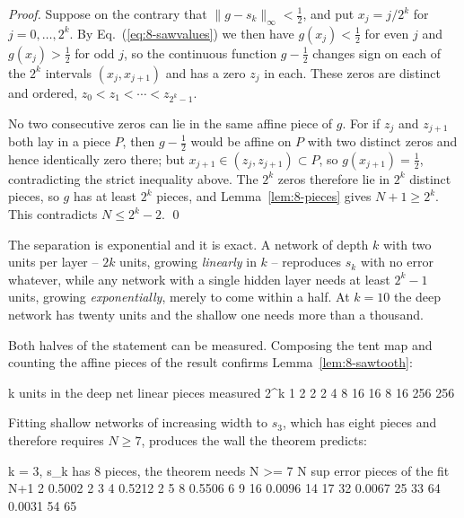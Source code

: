 \begin{proof}
Suppose on the contrary that $\|g-s_k\|_\infty<\tfrac12$, and put
$x_j=j/2^{k}$ for $j=0,\dots,2^{k}$.  By Eq.~(\ref{eq:8-sawvalues}) we then
have $g(x_j)<\tfrac12$ for even $j$ and $g(x_j)>\tfrac12$ for odd $j$, so the
continuous function $g-\tfrac12$ changes sign on each of the $2^{k}$ intervals
$(x_j,x_{j+1})$ and has a zero $z_j$ in each.  These zeros are distinct and
ordered, $z_0<z_1<\cdots<z_{2^{k}-1}$.

No two consecutive zeros can lie in the same affine piece of $g$.  For if $z_j$
and $z_{j+1}$ both lay in a piece $P$, then $g-\tfrac12$ would be affine on $P$
with two distinct zeros and hence identically zero there; but
$x_{j+1}\in(z_j,z_{j+1})\subset P$, so $g(x_{j+1})=\tfrac12$, contradicting the
strict inequality above.  The $2^{k}$ zeros therefore lie in $2^{k}$ distinct
pieces, so $g$ has at least $2^{k}$ pieces, and Lemma~\ref{lem:8-pieces} gives
$N+1\ge2^{k}$.  This contradicts $N\le2^{k}-2$.
\qed
\end{proof}

The separation is exponential and it is exact.  A network of depth $k$ with two
units per layer -- $2k$ units, growing \emph{linearly} in $k$ -- reproduces
$s_k$ with no error whatever, while any network with a single hidden layer
needs at least $2^{k}-1$ units, growing \emph{exponentially}, merely to come
within a half.  At $k=10$ the deep network has twenty units and the shallow one
needs more than a thousand.

Both halves of the statement can be measured.  Composing the tent map and
counting the affine pieces of the result confirms Lemma~\ref{lem:8-sawtooth}:

\begin{Python}{}
     k   units in the deep net   linear pieces measured   2^k
     1                       2                        2      2
     4                       8                       16     16
     8                      16                      256    256
\end{Python}

Fitting shallow networks of increasing width to $s_3$, which has eight pieces
and therefore requires $N\ge7$, produces the wall the theorem predicts:

\begin{Python}{}
   k = 3, s_k has 8 pieces, the theorem needs N >= 7
      N   sup error   pieces of the fit   N+1
      2      0.5002                   2      3
      4      0.5212                   2      5
      8      0.5506                   6      9
     16      0.0096                  14     17
     32      0.0067                  25     33
     64      0.0031                  54     65
\end{Python}

